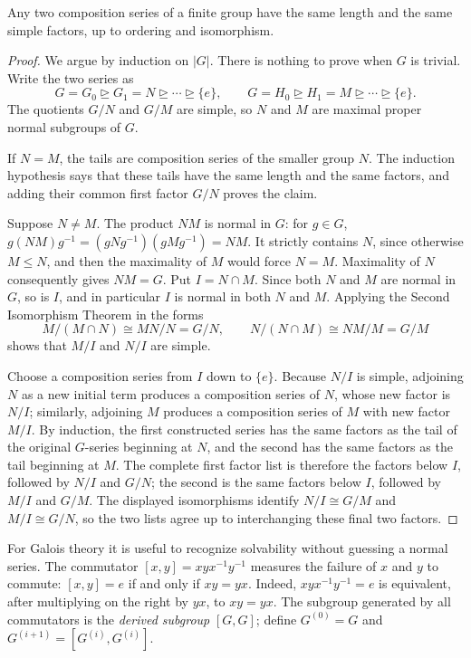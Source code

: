 \begin{theorem}
Any two composition series of a finite group have the same length and the same
simple factors, up to ordering and isomorphism.
\end{theorem}
\begin{proof}
We argue by induction on \(|G|\).  There is nothing to prove when \(G\) is
trivial.
Write the two series as
\[
 G=G_0\trianglerighteq G_1=N\trianglerighteq\cdots\trianglerighteq\{e\},
 \qquad
 G=H_0\trianglerighteq H_1=M\trianglerighteq\cdots\trianglerighteq\{e\}.
\]
The quotients \(G/N\) and \(G/M\) are simple, so \(N\) and \(M\) are maximal
proper normal subgroups of \(G\).

If \(N=M\), the tails are composition series of the smaller group \(N\).
The induction hypothesis says that these tails have the same length and the
same factors, and adding their common first factor \(G/N\) proves the claim.

Suppose \(N\ne M\).  The product \(NM\) is normal in \(G\): for \(g\in G\),
\(g(NM)g^{-1}=(gNg^{-1})(gMg^{-1})=NM\).  It strictly contains \(N\), since
otherwise \(M\leq N\), and then the maximality of \(M\) would force
\(N=M\).  Maximality of \(N\) consequently gives \(NM=G\).  Put
\(I=N\cap M\).  Since both \(N\) and \(M\) are normal in \(G\), so is \(I\),
and in particular \(I\) is normal in both \(N\) and \(M\).  Applying the Second
Isomorphism Theorem in the forms
\[
 M/(M\cap N)\cong MN/N=G/N,\qquad
 N/(N\cap M)\cong NM/M=G/M
\]
shows that \(M/I\) and \(N/I\) are simple.

Choose a composition series from \(I\) down to \(\{e\}\).  Because \(N/I\) is
simple, adjoining \(N\) as a new initial term produces a composition series
of \(N\), whose new factor is \(N/I\); similarly, adjoining \(M\) produces a
composition series of \(M\) with new factor \(M/I\).  By induction, the first constructed series has the same factors as
the tail of the original \(G\)-series beginning at \(N\), and the second has
the same factors as the tail beginning at \(M\).  The complete first factor
list is therefore the factors below \(I\), followed by \(N/I\) and \(G/N\);
the second is the same factors below \(I\), followed by \(M/I\) and \(G/M\).
The displayed isomorphisms identify \(N/I\cong G/M\) and
\(M/I\cong G/N\), so the two lists agree up to interchanging these final two
factors.
\end{proof}

For Galois theory it is useful to recognize solvability without guessing a
normal series.  The commutator \([x,y]=xyx^{-1}y^{-1}\) measures the failure
of \(x\) and \(y\) to commute: \([x,y]=e\) if and only if \(xy=yx\). Indeed,
\(xyx^{-1}y^{-1}=e\) is equivalent, after multiplying on the right by \(yx\),
to \(xy=yx\).  The subgroup generated by all commutators is the
\emph{derived subgroup} \([G,G]\); define \(G^{(0)}=G\) and
\(G^{(i+1)}=[G^{(i)},G^{(i)}]\).

